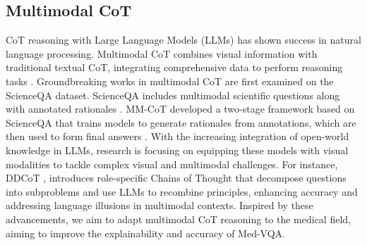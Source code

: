 \documentclass[11pt]{article}
\begin{document}
\subsection{Multimodal CoT}
CoT reasoning with Large Language Models (LLMs) has shown success in natural language processing. Multimodal CoT combines visual information with traditional textual CoT, integrating comprehensive data to perform reasoning tasks \cite{zhang2023multimodal,zheng2023ddcot}.
Groundbreaking works in multimodal CoT  \cite{zheng2023ddcot,zhang2023multimodal,lu2022learn,lu2023chameleon,zhang2023llama} are first examined on the ScienceQA dataset. ScienceQA includes multimodal scientific questions along with annotated rationales \cite{lu2022learn}.
MM-CoT developed a two-stage framework based on ScienceQA that trains models to generate rationales from annotations, which are then used to form final answers \cite{lu2022learn}. 
With the increasing integration of open-world knowledge in LLMs, research is focusing on equipping these models with visual modalities to tackle complex visual and multimodal challenges. For instance, DDCoT \cite{zheng2023ddcot}, introduces role-specific Chains of Thought that decompose questions into subproblems and use LLMs to recombine principles, enhancing accuracy and addressing language illusions in multimodal contexts.
Inspired by these advancements, we aim to adapt multimodal CoT reasoning to the medical field, aiming to improve the explainability and accuracy of Med-VQA.
\end{document}
